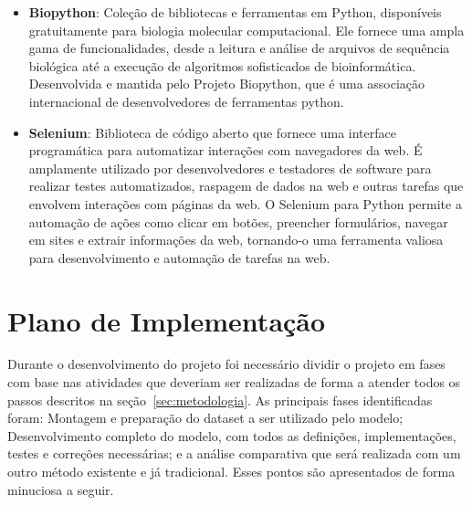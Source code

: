 \begin{itemize}
  \item \textbf{Biopython}: Coleção de bibliotecas e ferramentas em Python, disponíveis gratuitamente para biologia molecular computacional. Ele fornece uma ampla gama de funcionalidades, desde a leitura e análise de arquivos de sequência biológica até a execução de algoritmos sofisticados de bioinformática. Desenvolvida e mantida pelo Projeto Biopython, que é uma associação internacional de desenvolvedores de ferramentas python.~\cite{biopython}
  \item \textbf{Selenium}: Biblioteca de código aberto que fornece uma interface programática para automatizar interações com navegadores da web. É amplamente utilizado por desenvolvedores e testadores de software para realizar testes automatizados, raspagem de dados na web e outras tarefas que envolvem interações com páginas da web. O Selenium para Python permite a automação de ações como clicar em botões, preencher formulários, navegar em sites e extrair informações da web, tornando-o uma ferramenta valiosa para desenvolvimento e automação de tarefas na web.~\cite{selenium-python}
\end{itemize}


\section{Plano de Implementação}
Durante o desenvolvimento do projeto foi necessário dividir o projeto em fases com base nas atividades que deveriam ser realizadas de forma a atender todos os passos descritos na seção~\ref{sec:metodologia}. As principais fases identificadas foram: Montagem e preparação do dataset a ser utilizado pelo modelo; Desenvolvimento completo do modelo, com todos as definições, implementações, testes e correções necessárias; e a análise comparativa que será realizada com um outro método existente e já tradicional. Esses pontos são apresentados de forma minuciosa a seguir.

